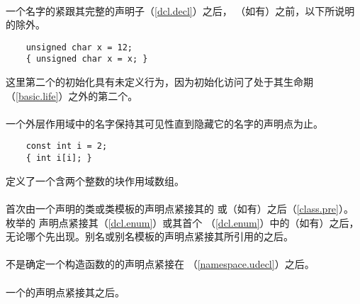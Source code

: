 \paragraph{} %
一个名字的紧跟其完整的声明子（\ref{dcl.decl}）之后，
（如有）之前，以下所说明的除外。

\begin{example} %
  \begin{lstlisting}
    unsigned char x = 12;
    { unsigned char x = x; }
  \end{lstlisting}
  这里第二个的初始化具有未定义行为，因为初始化访问了处于其生命期
  （\ref{basic.life}）之外的第二个。
\end{example}

\paragraph{} %
\begin{note} %
  一个外层作用域中的名字保持其可见性直到隐藏它的名字的声明点为止。

  \begin{example} %
    \begin{lstlisting}
    const int i = 2;
    { int i[i]; }
    \end{lstlisting}
    定义了一个含两个整数的块作用域数组。
  \end{example}

\end{note}

\paragraph{} %
首次由一个声明的类或类模板的声明点紧接其的
或（如有）之后（\ref{class.pre}）。枚举的
声明点紧接其（\ref{dcl.enum}）或其首个
（\ref{dcl.enum}）中的（如有）之后，
无论哪个先出现。别名或别名模板的声明点紧接其所引用的之后。

\paragraph{} %
不是确定一个构造函数的的声明点紧接在
（\ref{namespace.udecl}）之后。

\paragraph{} %
一个\enumr{}的声明点紧接其之后。

